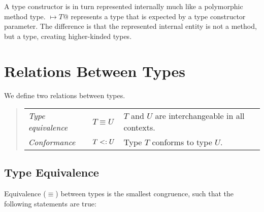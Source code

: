 A type constructor is in turn represented internally much like a polymorphic method type. \lstinline@[$\pm a_1$ >: $L_1$ <: $U_1 \commadots \pm a_n$ >: $L_n$ <: $U_n$] $\mapsto T$@ represents a type that is expected by a type constructor parameter. The difference is that the represented internal entity is not a method, but a type, creating higher-kinded types. 






\section{Relations Between Types}

We define two relations between types. 
\begin{quote}\begin{tabular}{l@{\gap}l@{\gap}l}
\em Type equivalence & $T \equiv U$ & $T$ and $U$ are interchangeable
in all contexts.
\\
\em Conformance & $T <: U$ & Type $T$ conforms to type $U$.
\end{tabular}\end{quote}






\subsection{Type Equivalence}

Equivalence ($\equiv$) between types is the smallest congruence, such that the following statements are true:

